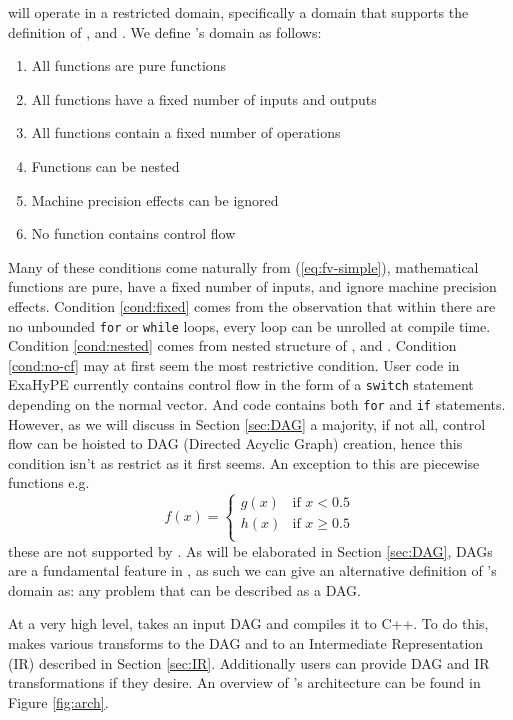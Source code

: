 \phlat will operate in a restricted domain, specifically a domain that supports the definition of ,  and .
We define \phlat{}'s domain as follows:
\begin{enumerate}
    \item All functions are pure functions
    \item All functions have a fixed number of inputs and outputs
    \item All functions contain a fixed number of operations \label{cond:fixed}
    \item Functions can be nested \label{cond:nested}
    \item Machine precision effects can be ignored
    \item No function contains control flow \label{cond:no-cf}
\end{enumerate}
Many of these conditions come naturally from (\ref{eq:fv-simple}), mathematical functions are pure, have a fixed number of inputs, and ignore machine precision effects.
Condition \ref{cond:fixed} comes from the observation that within  there are no unbounded \lstinline{for} or \lstinline{while} loops, every loop can be unrolled at compile time.
Condition \ref{cond:nested} comes from nested structure of ,  and .
Condition \ref{cond:no-cf} may at first seem the most restrictive condition.
User code in ExaHyPE currently contains control flow in the form of a \lstinline{switch} statement depending on the normal vector.
And  code contains both \lstinline{for} and \lstinline{if} statements.
However, as we will discuss in Section \ref{sec:DAG} a majority, if not all, control flow can be hoisted to DAG (Directed Acyclic Graph) creation, hence this condition isn't as restrict as it first seems.
An exception to this are piecewise functions e.g.
\[
    f(x) = \begin{cases} g(x)  & \text{if } x<0.5 \\  h(x)  & \text{if } x\geq 0.5 \\\end{cases}
\]
these are not supported by \phlat.
As will be elaborated in Section \ref{sec:DAG}, DAGs are a fundamental feature in \phlat, as such we can give an alternative definition of \phlat{}'s domain as: any problem that can be described as a DAG.

At a very high level, \phlat takes an input DAG and compiles it to C++.
To do this, \phlat makes various transforms to the DAG and to an Intermediate Representation (IR) described in Section \ref{sec:IR}.
Additionally users can provide DAG and IR transformations if they desire.
An overview of \phlat{}'s architecture can be found in Figure \ref{fig:arch}.

